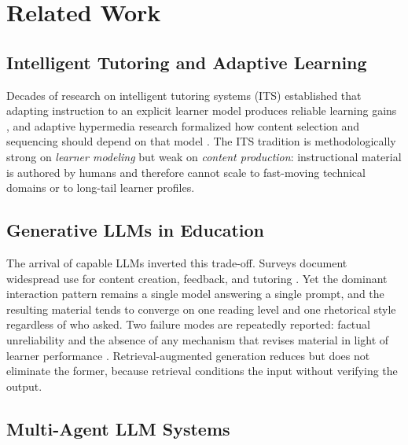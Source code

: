 \section{Related Work}
\label{sec:related}

\subsection{Intelligent Tutoring and Adaptive Learning}

Decades of research on intelligent tutoring systems (ITS) established that
adapting instruction to an explicit learner model produces reliable learning
gains \cite{vanlehn2011relative,kulik2016effectiveness}, and adaptive
hypermedia research formalized how content selection and sequencing should
depend on that model \cite{brusilovsky2001adaptive}. The ITS tradition is
methodologically strong on \emph{learner modeling} but weak on \emph{content
production}: instructional material is authored by humans and therefore cannot
scale to fast-moving technical domains or to long-tail learner profiles.

\subsection{Generative LLMs in Education}

The arrival of capable LLMs inverted this trade-off. Surveys document
widespread use for content creation, feedback, and tutoring
\cite{kasneci2023chatgpt,baidoo2023education}. Yet the dominant interaction
pattern remains a single model answering a single prompt, and the resulting
material tends to converge on one reading level and one rhetorical style
regardless of who asked. Two failure modes are repeatedly reported: factual
unreliability \cite{ji2023survey,huang2023survey} and the absence of any
mechanism that revises material in light of learner performance
\cite{doroudi2019instruction}. Retrieval-augmented generation
\cite{lewis2020rag,gao2023retrieval} reduces but does not eliminate the
former, because retrieval conditions the input without verifying the output.

\subsection{Multi-Agent LLM Systems}

